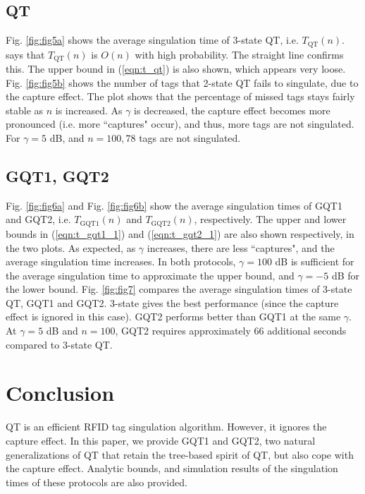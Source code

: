 \documentclass[conference]{IEEEtran}
\begin{document}
\subsection{QT}
Fig. \ref{fig:fig5a} shows the average singulation time of 3-state QT, i.e. $T_{\mbox{QT}}\left(n\right)$. \cite{conf:Law01} says that $T_{\mbox{QT}}\left(n\right)$ is $O\left(n\right)$ with high probability.  The straight line confirms this.  The upper bound in (\ref{eqn:t_qt}) is also shown, which appears very loose.  Fig. \ref{fig:fig5b} shows the number of tags that 2-state QT fails to singulate, due to the capture effect.  The plot shows that the percentage of missed tags stays fairly stable as $n$ is increased.  As $\gamma$ is decreased, the capture effect becomes more pronounced (i.e. more ``captures" occur), and thus, more tags are not singulated.  For $\gamma = 5$ dB, and $n=100, 78$ tags are not singulated.

\subsection{GQT1, GQT2}
Fig. \ref{fig:fig6a} and Fig. \ref{fig:fig6b} show the average singulation times of GQT1 and GQT2, i.e. $T_{\mbox{GQT1}}\left(n\right)$ and $T_{\mbox{GQT2}}\left(n\right)$, respectively.  The upper and lower bounds in (\ref{eqn:t_gqt1_1}) and (\ref{eqn:t_gqt2_1}) are also shown respectively, in the two plots.  As expected, as $\gamma$ increases, there are less ``captures", and the average singulation time increases.  In both protocols, $\gamma = 100$ dB is sufficient for the average singulation time to approximate the upper bound, and $\gamma = -5$ dB for the lower bound.  Fig. \ref{fig:fig7} compares the average singulation times of 3-state QT, GQT1 and GQT2.  3-state gives the best performance (since the capture effect is ignored in this case).  GQT2 performs better than GQT1 at the same $\gamma$.  At $\gamma = 5$ dB and $n=100$, GQT2 requires approximately $66$ additional seconds compared to 3-state QT.

\section{Conclusion}
\label{sec:con}
QT is an efficient RFID tag singulation algorithm.  However, it ignores the capture effect.  In this paper, we provide GQT1 and GQT2, two natural generalizations of QT that retain the tree-based spirit of QT, but also cope with the capture effect.  Analytic bounds, and simulation results of the singulation times of these protocols are also provided.
\end{document}
